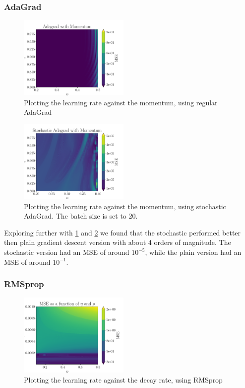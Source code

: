 \subsubsection{AdaGrad}
\begin{figure}[ht!]
    \centering
    \includegraphics[width = 0.475\textwidth]{../figs/AdagradMomentum_eta_gamma.pdf}
    \caption{Plotting the learning rate against the momentum, using regular AdaGrad}
    \label{fig: AdagradMomentum_eta_gamma}
\end{figure}
\begin{figure}[ht!]
    \centering
    \includegraphics[width = 0.475\textwidth]{../figs/AdagradMomentum_stochastic_eta_gamma.pdf}
    \caption{Plotting the learning rate against the momentum, using stochastic AdaGrad. The batch size is set to 20.}
    \label{fig: AdagradMomentum_stochastic_eta_gamma}
\end{figure}
Exploring further with \cref{fig: AdagradMomentum_eta_gamma} and \cref{fig: AdagradMomentum_stochastic_eta_gamma} we found that the stochastic performed better then plain gradient descent version with about 4 orders of magnitude. The stochastic version had an MSE of around \(10^{-5}\), while the plain version had an MSE of around \(10^{-1}\).

\subsubsection{RMSprop}
\begin{figure}[ht!]
    \centering
    \includegraphics[width = 0.475\textwidth]{../figs/RMS_Prop_eta_rho.pdf}
    \caption{Plotting the learning rate against the decay rate, using RMSprop}
    \label{fig: RMS_Prop_eta_rho}
\end{figure}

